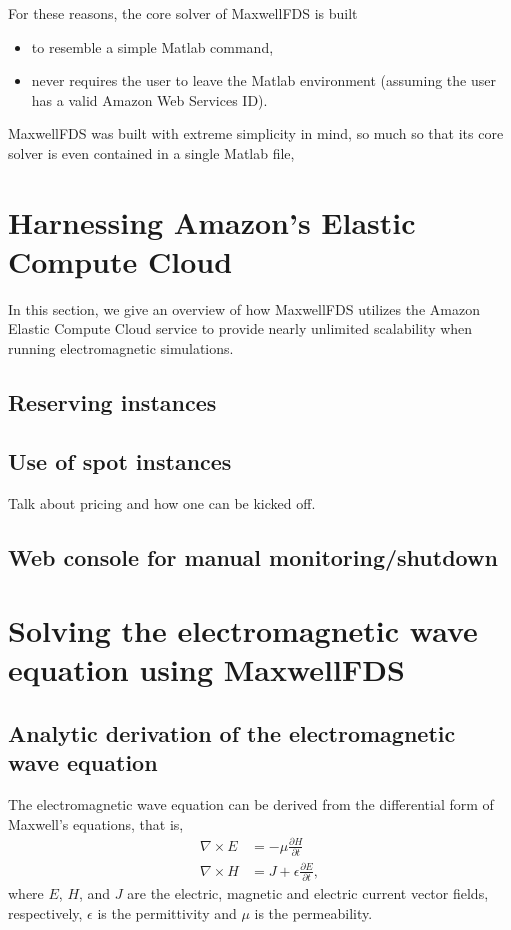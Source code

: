 \documentclass{article}
\newcommand{\EE}[2]{\begin{subequations}\begin{align}#2\end{align}\label{eq:#1}\end{subequations}}
\newcommand{\curl}{\nabla\times}
\newcommand{\MaxwellFDS}{MaxwellFDS }
\newcommand{\BI}{\begin{itemize}\item}
\newcommand{\EI}{\end{itemize}}
\newcommand{\I}{\item}
\begin{document}
For these reasons, the core solver of \MaxwellFDS is built
    \BI to resemble a simple Matlab command,
    \I  never requires the user to leave the Matlab environment
            (assuming the user has a valid Amazon Web Services ID). \EI

\MaxwellFDS was built with extreme simplicity in mind,
    so much so that its core solver is even contained in a single Matlab file,

\section{Harnessing Amazon's Elastic Compute Cloud} 
In this section, we give an overview of how \MaxwellFDS utilizes
    the Amazon Elastic Compute Cloud service to 
    provide nearly unlimited scalability when running electromagnetic simulations.

\subsection{Reserving instances}
\subsection{Use of spot instances}
Talk about pricing and how one can be kicked off.

\subsection{Web console for manual monitoring/shutdown}

\section{Solving the electromagnetic wave equation using \MaxwellFDS}
\subsection{Analytic derivation of the electromagnetic wave equation}
The electromagnetic wave equation can be derived from 
    the differential form of Maxwell's equations, that is,
\EE {maxwell diff}
    {\curl E &= - \mu \frac{\partial H}{\partial t} \\
    \curl H &= J + \epsilon \frac{\partial E}{\partial t}, }
    where $E$, $H$, and $J$ are 
    the electric, magnetic and electric current
    vector fields, respectively,
    $\epsilon$ is the permittivity
    and $\mu$ is the permeability.
\end{document}
